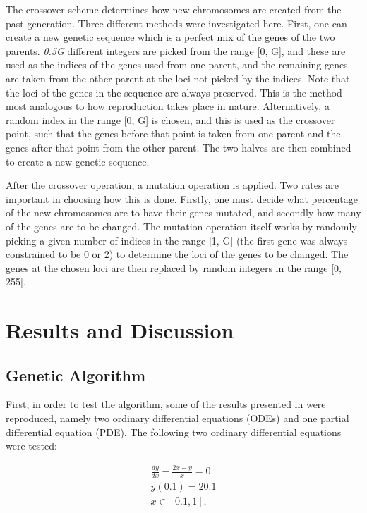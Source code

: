 \documentclass[multicolumn, 12pt]{extarticle}
\begin{document}
The crossover scheme determines how new chromosomes are created from the past generation. Three different methods were investigated here. First, one can create a new genetic sequence which is a perfect mix of the genes of the two parents. \textit{0.5G} different integers are picked from the range [0, G], and these are used as the indices of the genes used from one parent, and the remaining genes are taken from the other parent at the loci not picked by the indices. Note that the loci of the genes in the sequence are always preserved. This is the method most analogous to how reproduction takes place in nature. Alternatively, a random index in the range [0, G] is chosen, and this is used as the crossover point, such that the genes before that point is taken from one parent and the genes after that point from the other parent. The two halves are then combined to create a new genetic sequence.

After the crossover operation, a mutation operation is applied. Two rates are important in choosing how this is done. Firstly, one must decide what percentage of the new chromosomes are to have their genes mutated, and secondly how many of the genes are to be changed. The mutation operation itself works by randomly picking a given number of indices in the range [1, G] (the first gene was always constrained to be 0 or 2) to determine the loci of the genes to be changed. The genes at the chosen loci are then replaced by random integers in the range [0, 255].

\section{Results and Discussion}

\subsection{Genetic Algorithm}
First, in order to test the algorithm, some of the results presented in \cite{Lagaris} were reproduced, namely two ordinary differential equations (ODEs) and one partial differential equation (PDE). The following two ordinary differential equations were tested:

\begin{align*}
	\frac{dy}{dx}  - \frac{2x - y}{x} = 0 \\
	y(0.1) = 20.1                         \\
	x \in [0.1, 1],
\end{align*}
\end{document}
